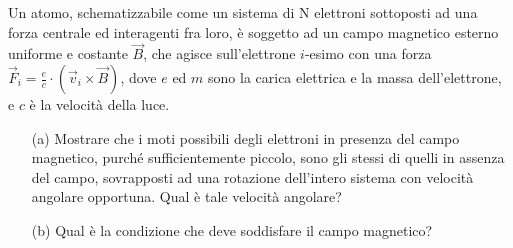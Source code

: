 \documentclass[../main.tex]{subfiles}
\begin{document}
  \newcommand\ecmvprod{\times}

  \textex
  Un atomo, schematizzabile come un sistema di N elettroni sottoposti ad una forza centrale ed interagenti fra loro, \`e soggetto ad un campo magnetico esterno uniforme e costante $\vec B$, che agisce sull'elettrone $i$-esimo con una forza $\vec F_i = \frac{e}{c} \cdot \left(\vec v_i \ecmvprod \vec B\right)$, dove $e$ ed $m$ sono la carica elettrica e la massa dell'elettrone, e $c$ \`e la velocit\`a della luce.

  \begin{itemize}
    \item[(a)] Mostrare che i moti possibili degli elettroni in presenza del campo magnetico, purch\'e sufficientemente piccolo, sono gli stessi di quelli in assenza del campo, sovrapposti ad una rotazione dell'intero sistema con velocit\`a angolare opportuna. \newline
    Qual \`e tale velocit\`a angolare?
    \item[(b)]Qual \`e la condizione che deve soddisfare il campo magnetico?
  \end{itemize}

  
  
  
  
\end{document}
